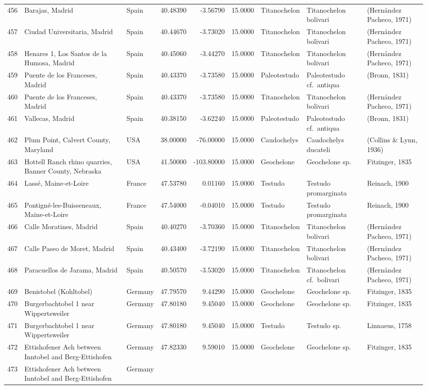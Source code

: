 \begin{landscape}
{\begin{longtable}[]{@{}lllrrrlll@{}}
456 & Barajas, Madrid & Spain & 40.48390 & -3.56790 & 15.0000 &
Titanochelon & Titanochelon bolivari & (Hernández Pacheco,
1971)\tabularnewline
457 & Ciudad Universitaria, Madrid & Spain & 40.44670 & -3.73020 &
15.0000 & Titanochelon & Titanochelon bolivari & (Hernández Pacheco,
1971)\tabularnewline
458 & Henares 1, Los Santos de la Humosa, Madrid & Spain & 40.45060 &
-3.44270 & 15.0000 & Titanochelon & Titanochelon bolivari & (Hernández
Pacheco, 1971)\tabularnewline
459 & Puente de los Franceses, Madrid & Spain & 40.43370 & -3.73580 &
15.0000 & Paleotestudo & Paleotestudo cf.~antiqua & (Bronn,
1831)\tabularnewline
460 & Puente de los Franceses, Madrid & Spain & 40.43370 & -3.73580 &
15.0000 & Titanochelon & Titanochelon bolivari & (Hernández Pacheco,
1971)\tabularnewline
461 & Vallecas, Madrid & Spain & 40.38150 & -3.62240 & 15.0000 &
Paleotestudo & Paleotestudo cf.~antiqua & (Bronn, 1831)\tabularnewline
462 & Plum Point, Calvert County, Maryland & USA & 38.00000 & -76.00000
& 15.0000 & Caudochelys & Caudochelys ducateli & (Collins \& Lynn,
1936)\tabularnewline
463 & Hottell Ranch rhino quarries, Banner County, Nebraska & USA &
41.50000 & -103.80000 & 15.0000 & Geochelone & Geochelone sp. &
Fitzinger, 1835\tabularnewline
464 & Lassé, Maine-et-Loire & France & 47.53780 & 0.01160 & 15.0000 &
Testudo & Testudo promarginata & Reinach, 1900\tabularnewline
465 & Pontigné-les-Buisseneaux, Maine-et-Loire & France & 47.54000 &
-0.04010 & 15.0000 & Testudo & Testudo promarginata & Reinach,
1900\tabularnewline
466 & Calle Moratines, Madrid & Spain & 40.40270 & -3.70360 & 15.0000 &
Titanochelon & Titanochelon bolivari & (Hernández Pacheco,
1971)\tabularnewline
467 & Calle Paseo de Moret, Madrid & Spain & 40.43400 & -3.72190 &
15.0000 & Titanochelon & Titanochelon bolivari & (Hernández Pacheco,
1971)\tabularnewline
468 & Paracuellos de Jarama, Madrid & Spain & 40.50570 & -3.53020 &
15.0000 & Titanochelon & Titanochelon cf.~bolivari & (Hernández Pacheco,
1971)\tabularnewline
469 & Benistobel (Kohltobel) & Germany & 47.79570 & 9.44290 & 15.0000 &
Geochelone & Geochelone sp. & Fitzinger, 1835\tabularnewline
470 & Burgerbachtobel 1 near Wippertsweiler & Germany & 47.80180 &
9.45040 & 15.0000 & Geochelone & Geochelone sp. & Fitzinger,
1835\tabularnewline
471 & Burgerbachtobel 1 near Wippertsweiler & Germany & 47.80180 &
9.45040 & 15.0000 & Testudo & Testudo sp. & Linnaeus,
1758\tabularnewline
472 & Ettishofener Ach between Inntobel and Berg-Ettishofen & Germany &
47.82330 & 9.59010 & 15.0000 & Geochelone & Geochelone sp. & Fitzinger,
1835\tabularnewline
473 & Ettishofener Ach between Inntobel and Berg-Ettishofen & Germany &

\end{longtable}}
\end{landscape}
